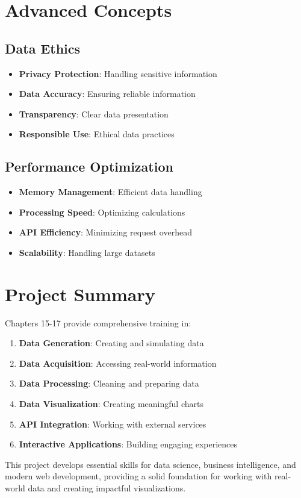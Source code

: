 \section*{Advanced Concepts}

\subsection*{Data Ethics}
\begin{itemize}
    \item \textbf{Privacy Protection}: Handling sensitive information
    \item \textbf{Data Accuracy}: Ensuring reliable information
    \item \textbf{Transparency}: Clear data presentation
    \item \textbf{Responsible Use}: Ethical data practices
\end{itemize}

\subsection*{Performance Optimization}
\begin{itemize}
    \item \textbf{Memory Management}: Efficient data handling
    \item \textbf{Processing Speed}: Optimizing calculations
    \item \textbf{API Efficiency}: Minimizing request overhead
    \item \textbf{Scalability}: Handling large datasets
\end{itemize}

\section*{Project Summary}
Chapters 15-17 provide comprehensive training in:
\begin{enumerate}
    \item \textbf{Data Generation}: Creating and simulating data
    \item \textbf{Data Acquisition}: Accessing real-world information
    \item \textbf{Data Processing}: Cleaning and preparing data
    \item \textbf{Data Visualization}: Creating meaningful charts
    \item \textbf{API Integration}: Working with external services
    \item \textbf{Interactive Applications}: Building engaging experiences
\end{enumerate}

This project develops essential skills for data science, business intelligence, and modern web development, providing a solid foundation for working with real-world data and creating impactful visualizations. 